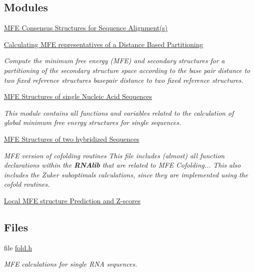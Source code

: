 \subsection*{Modules}
\begin{DoxyCompactItemize}
\item 
\hyperlink{group__consensus__mfe__fold}{M\+F\+E Consensus Structures for Sequence Alignment(s)}
\item 
\hyperlink{group__kl__neighborhood__mfe}{Calculating M\+F\+E representatives of a Distance Based Partitioning}
\begin{DoxyCompactList}\small\item\em Compute the minimum free energy (M\+FE) and secondary structures for a partitioning of the secondary structure space according to the base pair distance to two fixed reference structures basepair distance to two fixed reference structures. \end{DoxyCompactList}\item 
\hyperlink{group__mfe__fold__single}{M\+F\+E Structures of single Nucleic Acid Sequences}
\begin{DoxyCompactList}\small\item\em This module contains all functions and variables related to the calculation of global minimum free energy structures for single sequences. \end{DoxyCompactList}\item 
\hyperlink{group__mfe__cofold}{M\+F\+E Structures of two hybridized Sequences}
\begin{DoxyCompactList}\small\item\em M\+FE version of cofolding routines This file includes (almost) all function declarations within the {\bfseries R\+N\+Alib} that are related to M\+FE Cofolding... This also includes the Zuker suboptimals calculations, since they are implemented using the cofold routines. \end{DoxyCompactList}\item 
\hyperlink{group__local__mfe__fold}{Local M\+F\+E structure Prediction and Z-\/scores}
\end{DoxyCompactItemize}
\subsection*{Files}
\begin{DoxyCompactItemize}
\item 
file \hyperlink{fold_8h}{fold.\+h}
\begin{DoxyCompactList}\small\item\em M\+FE calculations for single R\+NA sequences. \end{DoxyCompactList}\end{DoxyCompactItemize}
